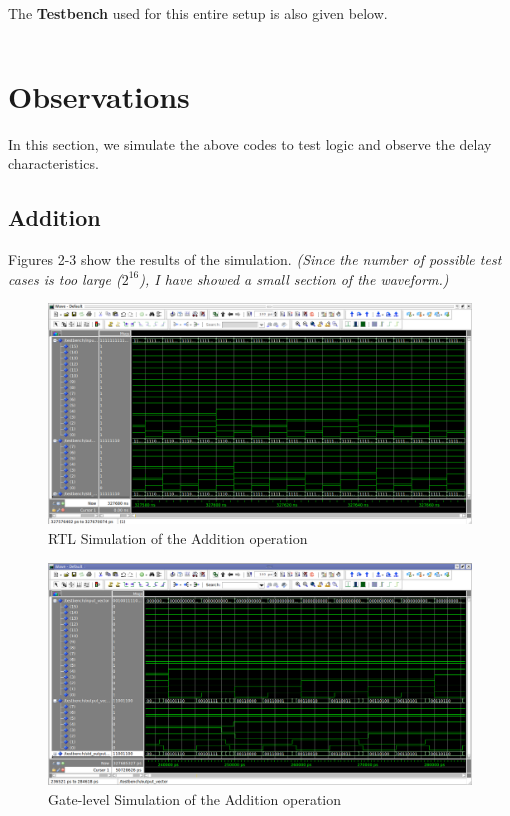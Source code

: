 \documentclass[a4paper, 11pt]{article}
\begin{document}
\inputminted[linenos]{vhdl}{ALU_exp/my_alu.vhd}
The \textbf{Testbench} used for this entire setup is also given below.
\inputminted[linenos]{vhdl}{ALU_exp/Testbench.vhd}

\section{Observations}
In this section, we simulate the above codes to test logic and observe the delay characteristics.
\subsection{Addition}
Figures 2-3 show the results of the simulation. \emph{(Since the number of possible test cases is too large ($2^{16}$), I have showed a small section of the waveform.)}

\begin{figure}[h]
\centering
\includegraphics[scale=0.33]{Adder_RTL}
\caption{RTL Simulation of the Addition operation}
\end{figure}

\begin{figure}[h]
\centering
\includegraphics[scale=0.33]{Adder_Gate}
\caption{Gate-level Simulation of the Addition operation}
\end{figure}
\end{document}
